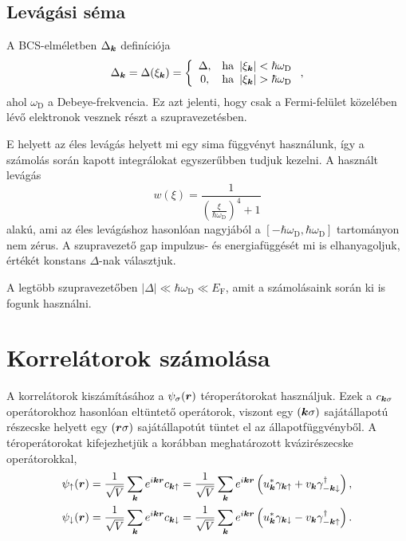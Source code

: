 \documentclass[a4paper,12pt,titlepage]{article}
\newcommand{\KK}{{\vb*{k}}}
\newcommand{\RR}{{\vb*{r}}}
\newcommand{\EF}{{E_\text{F}}}
\begin{document}
\subsection{Levágási séma}

A BCS-elméletben $\Delta_\KK$ definíciója
\begin{equation}
	\Delta_\KK = \Delta(\xi_\KK) = \left\{ \begin{array}{cl} \Delta, & \text{ha } \left| \xi_\KK \right| < \hbar \omega_\text{D} \\ 0, & \text{ha } \left| \xi_\KK \right| > \hbar \omega_\text{D} \end{array} \right. ,
\end{equation}
ahol $\omega_\text{D}$ a Debeye-frekvencia.  Ez azt jelenti, hogy csak a Fermi-felület közelében lévő elektronok vesznek részt a szupravezetésben.

E helyett az éles levágás helyett mi egy sima függvényt használunk, így a számolás során kapott integrálokat egyszerűbben tudjuk kezelni.  A használt levágás
\begin{equation} \label{cutoff}
	w(\xi) = \frac{1}{\left( \frac{\xi}{\hbar \omega_\text{D}} \right)^4 + 1}
\end{equation}
alakú, ami az éles levágáshoz hasonlóan nagyjából a $\left[ -\hbar \omega_\text{D}, \hbar \omega_\text{D} \right]$ tartományon nem zérus. A szupravezető gap impulzus- és energiafüggését mi is elhanyagoljuk, értékét konstans $\Delta$-nak választjuk.

A legtöbb szupravezetőben $\left|\Delta\right| \ll \hbar \omega_\text{D} \ll \EF$, amit a számolásaink során ki is fogunk használni.



\section{Korrelátorok számolása}

A korrelátorok kiszámításához a $\psi_\sigma(\RR)$ téroperátorokat használjuk.  Ezek a $c_{\KK \sigma}$ operátorokhoz hasonlóan eltüntető operátorok, viszont egy $\left( \KK \sigma \right)$ sajátállapotú részecske helyett egy $\left( \RR \sigma \right)$ sajátállapotút tüntet el az állapotfüggvényből.  A téroperátorokat kifejezhetjük a korábban meghatározott kvázirészecske operátorokkal,
\begin{equation} \label{psi}
\begin{split}
	\psi_\uparrow(\RR) & = \frac{1}{\sqrt{V}} \sum\limits_\KK e^{i \KK \RR} c_{\KK \uparrow} = \frac{1}{\sqrt{V}} \sum\limits_\KK e^{i \KK \RR} \left( u_\KK^* \gamma_{\KK \uparrow} + v_\KK \gamma_{-\KK \downarrow}^\dagger \right), \\
	\psi_\downarrow(\RR) & = \frac{1}{\sqrt{V}} \sum\limits_\KK e^{i \KK \RR} c_{\KK \downarrow} = \frac{1}{\sqrt{V}} \sum\limits_\KK e^{i \KK \RR} \left( u_\KK^* \gamma_{\KK \downarrow} - v_\KK \gamma_{-\KK \uparrow}^\dagger \right).
\end{split}
\end{equation}
\end{document}
